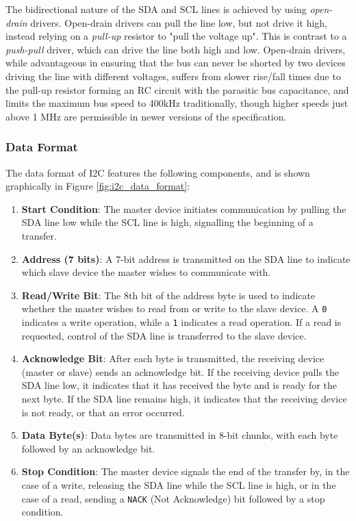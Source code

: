 \documentclass[main.tex]{subfiles}
\begin{document}
\noindent The bidirectional nature of the SDA and SCL lines is achieved by using \textit{open-drain} drivers. Open-drain drivers can pull the line low, but not drive it high, instead relying on a \textit{pull-up} resistor to "pull the voltage up". This is contrast to a \textit{push-pull} driver, which can drive the line both high and low. Open-drain drivers, while advantageous in ensuring that the bus can never be shorted by two devices driving the line with different voltages, suffers from slower rise/fall times due to the pull-up resistor forming an RC circuit with the parasitic bus capacitance, and limits the maximum bus speed to 400kHz traditionally, though higher speeds just above 1 MHz are permissible in newer versions of the specification.

\subsubsection{Data Format}
The data format of I2C features the following components, and is shown graphically in Figure \ref{fig:i2c_data_format}:
\begin{enumerate}
    \item \textbf{Start Condition}: The master device initiates communication by pulling the SDA line low while the SCL line is high, signalling the beginning of a transfer.
    \item \textbf{Address (7 bits)}: A 7-bit address is transmitted on the SDA line to indicate which slave device the master wishes to communicate with.
    \item \textbf{Read/Write Bit}: The 8th bit of the address byte is used to indicate whether the master wishes to read from or write to the slave device. A \texttt{0} indicates a write operation, while a \texttt{1} indicates a read operation. If a read is requested, control of the SDA line is transferred to the slave device.
    \item \textbf{Acknowledge Bit}: After each byte is transmitted, the receiving device (master or slave) sends an acknowledge bit. If the receiving device pulls the SDA line low, it indicates that it has received the byte and is ready for the next byte. If the SDA line remains high, it indicates that the receiving device is not ready, or that an error occurred.
    \item \textbf{Data Byte(s)}: Data bytes are transmitted in 8-bit chunks, with each byte followed by an acknowledge bit.
    \item \textbf{Stop Condition}: The master device signals the end of the transfer by, in the case of a write, releasing the SDA line while the SCL line is high, or in the case of a read, sending a \texttt{NACK} (Not Acknowledge) bit followed by a stop condition.
\end{enumerate}
\end{document}
